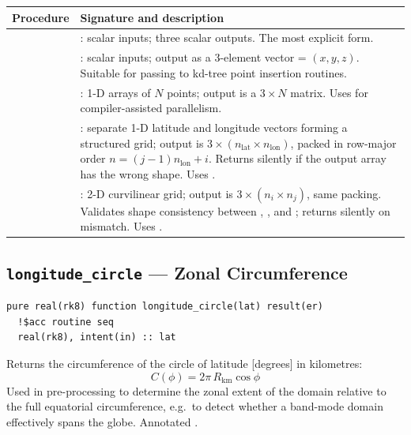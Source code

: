 \begin{longtable}{L{4.5cm} L{9.5cm}}
  \toprule
  \textbf{Procedure} & \textbf{Signature and description} \\
  \midrule
  \endhead
  \bottomrule
  \endfoot
   &
    : scalar inputs; three scalar 
    outputs. The most explicit form. \\
   &
    : scalar inputs; output as a 3-element vector
     = $(x,y,z)$. Suitable for passing to kd-tree point
    insertion routines. \\
   &
    : 1-D arrays of $N$ points;
    output is a $3\times N$ matrix. Uses  for
    compiler-assisted parallelism. \\
   &
    : separate 1-D latitude and longitude
    vectors forming a structured grid; output is $3\times(n_\text{lat}
    \times n_\text{lon})$, packed in row-major order $n = (j-1)n_\text{lon}+i$.
    Returns silently if the output array has the wrong shape. Uses
    . \\
   &
    : 2-D curvilinear grid; output is
    $3\times(n_i\times n_j)$, same packing. Validates shape consistency
    between , , and ; returns silently on
    mismatch. Uses . \\
\end{longtable}

\subsection{\texttt{longitude\_circle} --- Zonal Circumference}
\label{subsec:earth_loncircle}

\begin{lstlisting}
pure real(rk8) function longitude_circle(lat) result(er)
  !$acc routine seq
  real(rk8), intent(in) :: lat
\end{lstlisting}

Returns the circumference of the circle of latitude  [degrees]
in kilometres:
\[
  C(\phi) = 2\pi\,R_\text{km}\cos\phi
\]
Used in pre-processing to determine the zonal extent of the domain relative
to the full equatorial circumference, e.g.\ to detect whether a band-mode
domain effectively spans the globe. Annotated .

